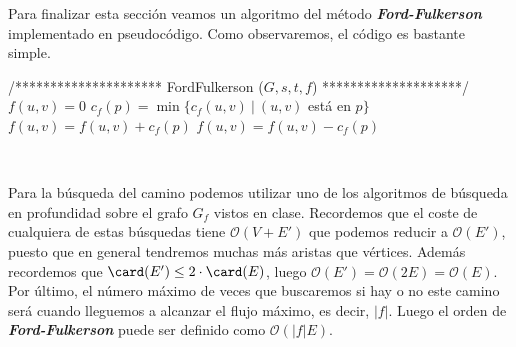 Para finalizar esta sección veamos un algoritmo del método \textbf{\textit{Ford-Fulkerson}} implementado en pseudocódigo. Como observaremos, el código es bastante simple.

\begin{algorithmic}[1]
\State /*********************
\State	* FordFulkerson ($G,s,t,f$)
\State *********************/
	\State $f(u,v) = 0$
\EndFor
{}
	\State $c_f(p)=\min\{c_f(u,v)\ |\ (u,v)$ está en $p\}$
			\State $f(u,v) = f(u,v) +c_f(p)$
		\Else
			\State $f(u,v) = f(u,v) -c_f(p)$
		\EndIf
	\EndFor
\EndWhile
\end{algorithmic}
\ 

Para la búsqueda del camino podemos utilizar uno de los algoritmos de búsqueda en profundidad sobre el grafo $G_f$ vistos en clase. Recordemos que el coste de cualquiera de estas búsquedas tiene $\mathcal{O}(V+E')$ que podemos reducir a $\mathcal{O}(E')$, puesto que en general tendremos muchas más aristas que vértices. Además recordemos que $\card(E')\leq2\cdot\card(E)$, luego $\mathcal{O}(E')=\mathcal{O}(2E)=\mathcal{O}(E)$.
Por último, el número máximo de veces que buscaremos si hay o no este camino será cuando lleguemos a alcanzar el flujo máximo, es decir, $|f|$. Luego el orden de \textbf{\textit{Ford-Fulkerson}} puede ser definido como $\mathcal{O}(|f|E)$.